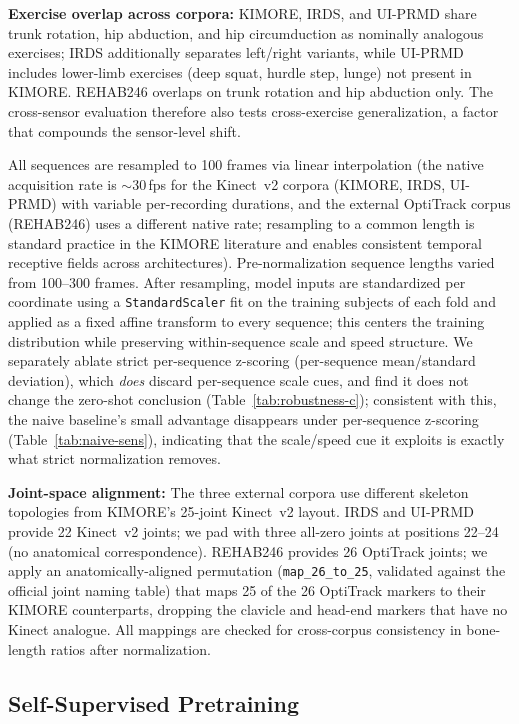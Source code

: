 \documentclass[10pt,journal]{IEEEtran}
\begin{document}
\textbf{Exercise overlap across corpora:} KIMORE, IRDS, and UI-PRMD share trunk rotation, hip abduction, and hip circumduction as nominally analogous exercises; IRDS additionally separates left/right variants, while UI-PRMD includes lower-limb exercises (deep squat, hurdle step, lunge) not present in KIMORE. REHAB246 overlaps on trunk rotation and hip abduction only. The cross-sensor evaluation therefore also tests cross-exercise generalization, a factor that compounds the sensor-level shift.

All sequences are resampled to 100 frames via linear interpolation (the native acquisition rate is $\sim$30\,fps for the Kinect~v2 corpora (KIMORE, IRDS, UI-PRMD) with variable per-recording durations, and the external OptiTrack corpus (REHAB246) uses a different native rate; resampling to a common length is standard practice in the KIMORE literature \cite{karlov2024,abedi2023} and enables consistent temporal receptive fields across architectures). Pre-normalization sequence lengths varied from 100--300 frames. After resampling, model inputs are standardized per coordinate using a \texttt{StandardScaler} fit on the training subjects of each fold and applied as a fixed affine transform to every sequence; this centers the training distribution while preserving within-sequence scale and speed structure. We separately ablate strict per-sequence z-scoring (per-sequence mean/standard deviation), which \emph{does} discard per-sequence scale cues, and find it does not change the zero-shot conclusion (Table~\ref{tab:robustness-c}); consistent with this, the naive baseline's small advantage disappears under per-sequence z-scoring (Table~\ref{tab:naive-sens}), indicating that the scale/speed cue it exploits is exactly what strict normalization removes.

\textbf{Joint-space alignment:} The three external corpora use different skeleton topologies from KIMORE's 25-joint Kinect~v2 layout. IRDS and UI-PRMD provide 22 Kinect~v2 joints; we pad with three all-zero joints at positions 22--24 (no anatomical correspondence). REHAB246 provides 26 OptiTrack joints; we apply an anatomically-aligned permutation (\texttt{map\_26\_to\_25}, validated against the official joint naming table) that maps 25 of the 26 OptiTrack markers to their KIMORE counterparts, dropping the clavicle and head-end markers that have no Kinect analogue. All mappings are checked for cross-corpus consistency in bone-length ratios after normalization.

\subsection{Self-Supervised Pretraining}
\label{sec:pretraining}
\end{document}
